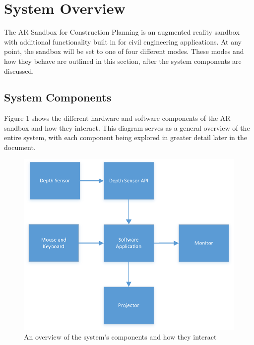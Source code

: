 \documentclass[onecolumn, draftclsnofoot,10pt, compsoc]{IEEEtran}
\begin{document}
\section{System Overview}


The AR Sandbox for Construction Planning is an augmented reality sandbox with additional functionality built in for civil engineering applications.
At any point, the sandbox will be set to one of four different modes.
These modes and how they behave are outlined in this section, after the system components are discussed.

\vfill

\subsection{System Components}
\par Figure 1 shows the different hardware and software components of the AR sandbox and how they interact. This diagram serves as a general overview of the entire system, with each component being explored in greater detail later in the document.

\begin{figure}[H] 
	\centering
	\includegraphics[width=6in]{BlockDiagram}
    \caption{An overview of the system's components and how they interact}
    \label{fig:overview}
\end{figure}
\end{document}
